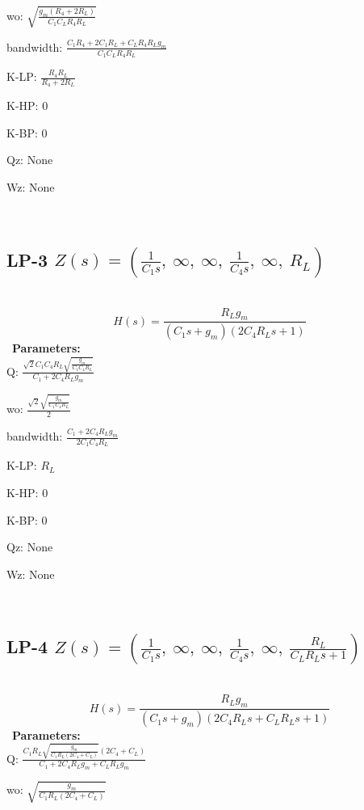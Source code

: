 \documentclass{article}
\begin{document}
wo: $\sqrt{\frac{g_{m} \left(R_{4} + 2 R_{L}\right)}{C_{1} C_{L} R_{4} R_{L}}}$\ 

bandwidth: $\frac{C_{1} R_{4} + 2 C_{1} R_{L} + C_{L} R_{4} R_{L} g_{m}}{C_{1} C_{L} R_{4} R_{L}}$\ 

K-LP: $\frac{R_{4} R_{L}}{R_{4} + 2 R_{L}}$\ 

K-HP: $0$\ 

K-BP: $0$\ 

Qz: $\text{None}$\ 

Wz: $\text{None}$\ 

\ 

\subsection{LP-3 $Z(s) = \left( \frac{1}{C_{1} s}, \  \infty, \  \infty, \  \frac{1}{C_{4} s}, \  \infty, \  R_{L}\right)$ } \ 
\textbf{\[H(s) = \frac{R_{L} g_{m}}{\left(C_{1} s + g_{m}\right) \left(2 C_{4} R_{L} s + 1\right)}\] } \ 
\textbf{Parameters:}\\ 

Q: $\frac{\sqrt{2} C_{1} C_{4} R_{L} \sqrt{\frac{g_{m}}{C_{1} C_{4} R_{L}}}}{C_{1} + 2 C_{4} R_{L} g_{m}}$\ 

wo: $\frac{\sqrt{2} \sqrt{\frac{g_{m}}{C_{1} C_{4} R_{L}}}}{2}$\ 

bandwidth: $\frac{C_{1} + 2 C_{4} R_{L} g_{m}}{2 C_{1} C_{4} R_{L}}$\ 

K-LP: $R_{L}$\ 

K-HP: $0$\ 

K-BP: $0$\ 

Qz: $\text{None}$\ 

Wz: $\text{None}$\ 

\ 

\subsection{LP-4 $Z(s) = \left( \frac{1}{C_{1} s}, \  \infty, \  \infty, \  \frac{1}{C_{4} s}, \  \infty, \  \frac{R_{L}}{C_{L} R_{L} s + 1}\right)$ } \ 
\textbf{\[H(s) = \frac{R_{L} g_{m}}{\left(C_{1} s + g_{m}\right) \left(2 C_{4} R_{L} s + C_{L} R_{L} s + 1\right)}\] } \ 
\textbf{Parameters:}\\ 

Q: $\frac{C_{1} R_{L} \sqrt{\frac{g_{m}}{C_{1} R_{L} \left(2 C_{4} + C_{L}\right)}} \left(2 C_{4} + C_{L}\right)}{C_{1} + 2 C_{4} R_{L} g_{m} + C_{L} R_{L} g_{m}}$\ 

wo: $\sqrt{\frac{g_{m}}{C_{1} R_{L} \left(2 C_{4} + C_{L}\right)}}$\ 
\end{document}
